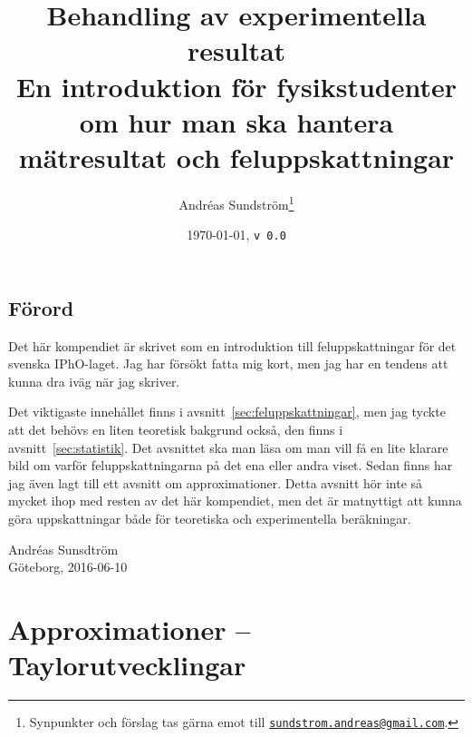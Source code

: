 \documentclass[11pt,a4paper, english, swedish
]{article}
\begin{document}

\title{ Behandling av experimentella resultat\\[2mm] 
\Large En introduktion för fysikstudenter om hur man ska hantera
mätresultat och feluppskattningar}
\author{Andréas Sundström\footnote{Synpunkter och förslag tas gärna
    emot till
\href{mailto:sundstrom.andreas@gmail.com}{\nolinkurl{sundstrom.andreas@gmail.com}}.}}
\date{\today, \quad\texttt{v\,0.0}}

\maketitle


\subsection*{Förord}
\small
Det här kompendiet är skrivet som en introduktion till
feluppskattningar för det svenska IPhO-laget. Jag har försökt fatta
mig kort, men jag har en tendens att kunna dra iväg när jag
skriver. 

Det viktigaste innehållet finns i avsnitt~\ref{sec:feluppskattningar},
men jag tyckte att det behövs en liten teoretisk bakgrund också, den
finns i avsnitt~\ref{sec:statistik}. Det avsnittet ska man läsa om man
vill få en lite klarare bild om varför feluppskattningarna på det ena
eller andra viset. Sedan finns har jag även lagt till ett avsnitt om
approximationer. Detta avsnitt hör inte så mycket ihop med resten av
det här kompendiet, men det är matnyttigt att kunna göra
uppskattningar både för teoretiska och experimentella beräkningar. 
\begin{flushright}
Andréas Sunsdtröm\\ 
Göteborg, 2016-06-10
\end{flushright}
\normalsize

\tableofcontents
\clearpage
\restoregeometry

\addtocounter{section}{-1}
\section{Approximationer -- Taylorutvecklingar}

\begin{figure}
\centering

\caption{}
\label{fig_taylor_sin}
\end{figure}
\end{document}
